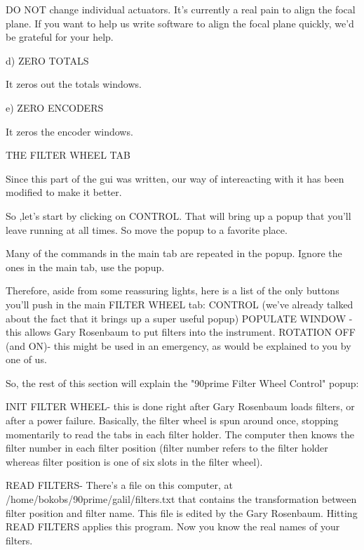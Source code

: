 \documentclass[letterpaper,12pt]{article}
\begin{document}
          DO NOT change individual actuators. It's currently
          a real pain to align the focal plane. If you want to
          help us write software to align the focal plane quickly,
          we'd be grateful for your help.

       d) ZERO TOTALS

          It zeros out the totals windows.

       e) ZERO ENCODERS

          It zeros the encoder windows. 
 

       THE FILTER WHEEL TAB

       Since this part of the gui was written, our way of intereacting
       with it has been modified to make it better.
   
       So ,let's start by clicking on CONTROL. 
       That will bring up a popup that you'll leave running at all times.
       So move the popup to a favorite place.

       Many of the commands in the main tab are repeated in the popup.
       Ignore the ones in the main tab, use the popup.

       Therefore, aside from some reassuring lights, here is a list
       of the only buttons you'll push in the main FILTER WHEEL tab:
        CONTROL (we've already talked about the fact that it brings
         up a super useful popup)
        POPULATE WINDOW - this allows Gary Rosenbaum to put filters
         into the instrument.
        ROTATION OFF (and ON)- this might be used in an emergency, as
         would be explained to you by one of us.

       So, the rest of this section will explain the "90prime Filter
        Wheel Control" popup:

        INIT FILTER WHEEL- this is done right after Gary Rosenbaum
         loads filters, or after a power failure. Basically, the filter wheel
         is spun around once, stopping momentarily to read the tabs
         in each filter holder. The computer then knows the filter
         number in each filter position (filter number refers to the filter
         holder whereas filter position is one of six slots in the filter
         wheel).

        READ FILTERS- There's a file on this computer, at
         /home/bokobs/90prime/galil/filters.txt
         that contains the transformation between filter position
         and filter name. This file is edited by the Gary Rosenbaum.
         Hitting READ FILTERS applies this program. Now
         you know the real names of your filters.
\end{document}

